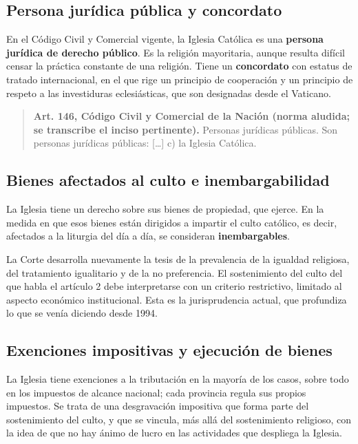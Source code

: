 \documentclass[12pt,oneside]{book}
\begin{document}
\subsection{Persona jurídica pública y concordato}

En el Código Civil y Comercial vigente, la Iglesia Católica es una \textbf{persona jurídica de derecho público}. Es la religión mayoritaria, aunque resulta difícil censar la práctica constante de una religión. Tiene un \textbf{concordato} con estatus de tratado internacional, en el que rige un principio de cooperación y un principio de respeto a las investiduras eclesiásticas, que son designadas desde el Vaticano.

\begin{quote}
\textbf{Art. 146, Código Civil y Comercial de la Nación (norma aludida; se transcribe el inciso pertinente).} Personas jurídicas públicas. Son personas jurídicas públicas: [\ldots] c) la Iglesia Católica.
\end{quote}

\subsection{Bienes afectados al culto e inembargabilidad}

La Iglesia tiene un derecho sobre sus bienes de propiedad, que ejerce. En la medida en que esos bienes están dirigidos a impartir el culto católico, es decir, afectados a la liturgia del día a día, se consideran \textbf{inembargables}.

La Corte desarrolla nuevamente la tesis de la prevalencia de la igualdad religiosa, del tratamiento igualitario y de la no preferencia. El sostenimiento del culto del que habla el artículo 2 debe interpretarse con un criterio restrictivo, limitado al aspecto económico institucional. Esta es la jurisprudencia actual, que profundiza lo que se venía diciendo desde 1994.

\subsection{Exenciones impositivas y ejecución de bienes}

La Iglesia tiene exenciones a la tributación en la mayoría de los casos, sobre todo en los impuestos de alcance nacional; cada provincia regula sus propios impuestos. Se trata de una desgravación impositiva que forma parte del sostenimiento del culto, y que se vincula, más allá del sostenimiento religioso, con la idea de que no hay ánimo de lucro en las actividades que despliega la Iglesia.
\end{document}
